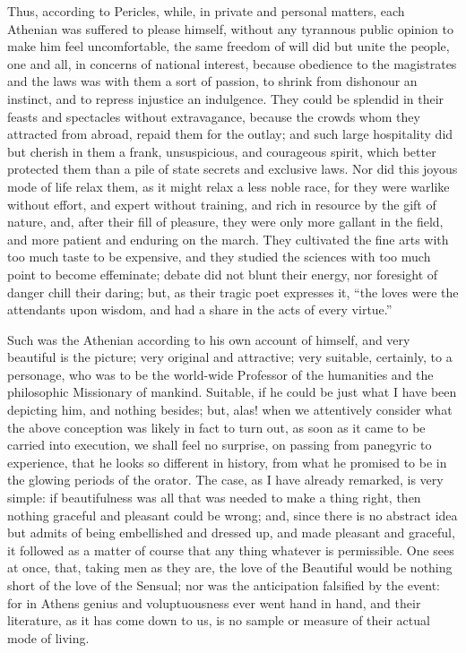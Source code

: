 Thus, according to Pericles, while, in private and personal
matters, each Athenian was suffered to please himself, without any
tyrannous public opinion to make him feel uncomfortable, the same
freedom of will did but unite the people, one and all, in concerns of
national interest, because obedience to the magistrates and the laws
was with them a sort of passion, to shrink from dishonour an instinct,
and to repress injustice an indulgence. They could be splendid in
their feasts and spectacles without extravagance, because the crowds
whom they attracted from abroad, repaid them for the outlay; and such
large hospitality did but cherish in them a frank, unsuspicious, and
courageous spirit, which better protected them than a pile of
state secrets and exclusive laws. Nor did this joyous mode of life
relax them, as it might relax a less noble race, for they were warlike
without effort, and expert without training, and rich in resource by
the gift of nature, and, after their fill of pleasure, they were only
more gallant in the field, and more patient and enduring on the march.
They cultivated the fine arts with too much taste to be expensive, and
they studied the sciences with too much point to become effeminate;
debate did not blunt their energy, nor foresight of danger chill their
daring; but, as their tragic poet expresses it, ``the loves were
the attendants upon wisdom, and had a share in the acts of every
virtue.''

Such was the Athenian according to his own account of himself, and
very beautiful is the picture; very original and attractive; very
suitable, certainly, to a personage, who was to be the world-wide
Professor of the humanities and the philosophic Missionary of mankind.
Suitable, if he could be just what I have been depicting him, and
nothing besides; but, alas! when we attentively consider what the
above conception was likely in fact to turn out, as soon as it came to
be carried into execution, we shall feel no surprise, on passing from
panegyric to experience, that he looks so different in history, from
what he promised to be in the glowing periods of the orator. The case,
as I have already remarked, is very simple: if beautifulness was all
that was needed to make a thing right, then nothing graceful and
pleasant could be wrong; and, since there is no abstract idea but
admits of being embellished and dressed up, and made pleasant and
graceful, it followed as a matter of course that any thing whatever is
permissible. One sees at once, that, taking men as they are, the
love of the Beautiful would be nothing short of the love of the
Sensual; nor was the anticipation falsified by the event: for in
Athens genius and voluptuousness ever went hand in hand, and their
literature, as it has come down to us, is no sample or measure of
their actual mode of living.

